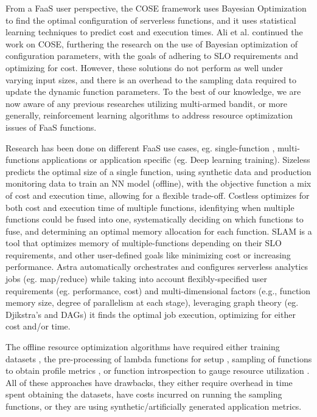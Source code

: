 \documentclass[conference]{IEEEtran}
\begin{document}
From a FaaS user perspective, the COSE \cite{9155363} framework uses Bayesian Optimization to find the optimal configuration of serverless functions, and it uses statistical learning techniques to predict cost and execution times. Ali et al. \cite{10063937} continued the work on COSE, furthering the research on the use of Bayesian optimization of configuration parameters, with the goals of adhering to SLO requirements and optimizing for cost. However, these solutions do not perform as well under varying input sizes, and there is an overhead to the sampling data required to update the dynamic function parameters. To the best of our knowledge, we are now aware of any previous researches utilizing multi-armed bandit, or more generally, reinforcement learning algorithms to address resource optimization issues of FaaS functions. 

Research has been done on different FaaS use cases, eg. single-function \cite{10.1145/3429880.3430099, 9946331, 9881584}, multi-functions applications \cite{s23187829, 8567674} or application specific \cite{9826021} (eg. Deep learning training). Sizeless \cite{10.1145/3464298.3493398} predicts the optimal size of a single function, using synthetic data and production monitoring data to train an NN model (offline), with the objective function a mix of cost and execution time, allowing for a flexible trade-off. Costless \cite {8567674} optimizes for both cost and execution time of multiple functions, idenfitying when multiple functions could be fused into one, systematically deciding on which functions to fuse, and determining an optimal memory allocation for each function. SLAM \cite{9860980} is a tool that optimizes memory of multiple-functions depending on their SLO requirements, and other user-defined goals like minimizing cost or increasing performance. Astra \cite{9460548} automatically orchestrates and configures serverless analytics jobs (eg. map/reduce) while taking into account flexibly-specified user requirements (eg. performance, cost) and multi-dimensional factors (e.g., function memory size, degree of parallelism at each stage), leveraging graph theory (eg. Djikstra's and DAGs) it finds the optimal job execution, optimizing for either cost and/or time.

The offline resource optimization algorithms have required either training datasets \cite{10.1145/3464298.3493398, 10.1145/3542929.3563468}, the pre-processing of lambda functions for setup \cite{10.1109/INFOCOM48880.2022.9796962, 8567674}, sampling of functions to obtain profile metrics \cite{10.1145/3542929.3563464}, or function introspection to gauge resource utilization \cite{s23187829, 9336272}. All of these approaches have drawbacks, they either require overhead in time spent obtaining the datasets, have costs incurred on running the sampling functions, or they are using synthetic/artificially generated application metrics.
\end{document}
